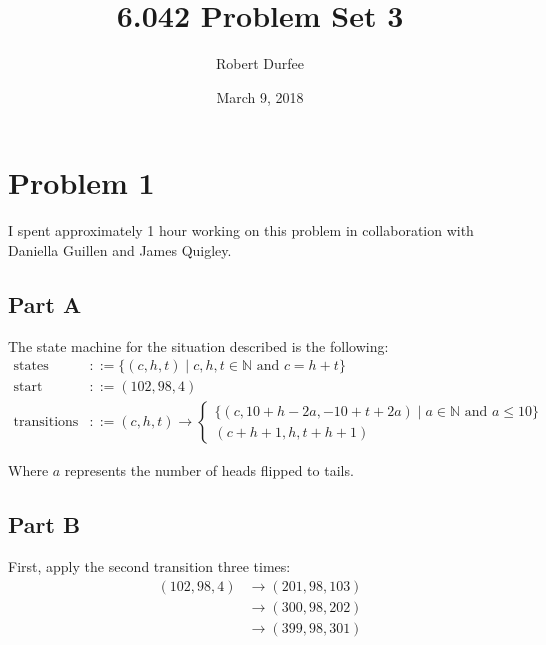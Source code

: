 \documentclass{article}
\title{ 6.042 Problem Set 3 }
\author{ Robert Durfee }
\date{ March 9, 2018 }
\begin{document}
\maketitle

\section*{Problem 1 }

I spent approximately 1 hour working on this problem in collaboration with
Daniella Guillen and James Quigley.

\subsection*{Part A}

The state machine for the situation described is the following:
\begin{equation*}
  \begin{split}
    \textrm{states} &::= \{ (c, h, t) \mid c, h, t \in \mathbb{N} \textrm{ and }
    c = h + t \} \\
    \textrm{start} &::= (102, 98, 4) \\
    \textrm{transitions} &::= (c, h, t) \longrightarrow
      \begin{cases}
        \{ (c, 10 + h - 2a, -10 + t + 2a) \mid a \in \mathbb{N} \textrm{ and } a \leq 10\}& \\
        (c + h + 1, h, t + h + 1)&
      \end{cases}
  \end{split}
\end{equation*}

Where $a$ represents the number of heads flipped to tails.

\bigbreak
\bigbreak
\bigbreak
\bigbreak
\bigbreak
\bigbreak
\bigbreak
\bigbreak
\bigbreak
\bigbreak
\bigbreak

\subsection*{Part B}

First, apply the second transition three times:
\begin{equation*}
  \begin{split}
    (102, 98, 4) &\longrightarrow (201, 98, 103) \\
                 &\longrightarrow (300, 98, 202) \\
                 &\longrightarrow (399, 98, 301)
  \end{split}
\end{equation*}
\end{document}
